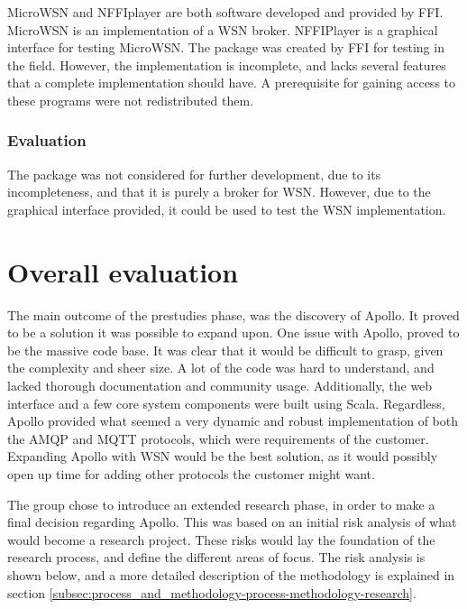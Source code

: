 MicroWSN and NFFIplayer are both software developed and provided by FFI. MicroWSN is an implementation of a WSN broker. NFFIPlayer is a graphical interface for testing MicroWSN. The package was created by FFI for testing in the field. However, the implementation is incomplete, and lacks several features that a complete implementation should have. A prerequisite for gaining access to these programs were not redistributed them.

\subsubsection{Evaluation}
\label{subsec:prestudies-existing_solutions-micro_wsn_and_nffiplayer-evaluation}

The package was not considered for further development, due to its incompleteness, and that it is purely a broker for WSN. However, due to the graphical interface provided, it could be used to test the WSN implementation.

\section{Overall evaluation}
\label{sec:prestudies-overall_evaluation}

The main outcome of the prestudies phase, was the discovery of Apollo. It proved to be a solution it was possible to expand upon. One issue with Apollo, proved to be the massive code base. It was clear that it would be difficult to grasp, given the complexity and sheer size. A lot of the code was hard to understand, and lacked thorough documentation and community usage. Additionally, the web interface and a few core system components were built using Scala. Regardless, Apollo provided what seemed a very dynamic and robust implementation of both the AMQP and MQTT protocols, which were requirements of the customer. Expanding Apollo with WSN would be the best solution, as it would possibly open up time for adding other protocols the customer might want.

The group chose to introduce an extended research phase, in order to make a final decision regarding Apollo. This was based on an initial risk analysis of what would become a research project. These risks would lay the foundation of the research process, and define the different areas of focus. The risk analysis is shown below, and a more detailed description of the methodology is explained in section \ref{subsec:process_and_methodology-process-methodology-research}.

